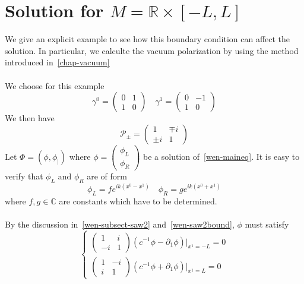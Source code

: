 \section{Solution for $M = \mathbb R \times [-L, L]$ }
We give an explicit example to see how this boundary condition can affect the solution. 
In particular, we calculte the vacuum polarization by using the method introduced in~\cref{chap-vacuum}\\\\
We choose for this example
\begin{equation*}
\gamma^0 = \begin{pmatrix} 0 & 1 \\ 1 & 0 \end{pmatrix} \quad
\gamma^1 = \begin{pmatrix} 0 & -1 \\ 1 & 0 \end{pmatrix}
\end{equation*}
We then have 
\begin{equation*}
\mathcal{P}_\pm = \begin{pmatrix} 1 & \mp i \\ \pm i & 1 \end{pmatrix}
\end{equation*}
Let $\Phi = (\phi, \phi_|)$ where $\phi = \begin{pmatrix} \phi_L \\ \phi_R \end{pmatrix}$ be a solution of~\cref{wen-maineq}. 
It is easy to verify that $\phi_L$ and $\phi_R$ are of form
\begin{equation*}
\phi_L = f e^{ik(x^0 - x^1)} \quad
\phi_R = g e^{ik(x^0 + x^1)}
\end{equation*}
where $f, g\in\mathbb C$ are constants which have to be determined. \\\\
By the discussion in~\cref{wen-subsect-saw2} and~\cref{wen-saw2bound}, $\phi$ must satisfy
\begin{equation*}
\begin{cases}
\begin{pmatrix} 1 & i \\ -i & 1 \end{pmatrix}(c^{-1} \phi - \partial_1 \phi)\vert_{x^1 = -L} = 0 \\
%
\begin{pmatrix} 1 & -i \\ i & 1 \end{pmatrix}(c^{-1} \phi + \partial_1 \phi)\vert_{x^1 = L} = 0
\end{cases}
\end{equation*}

